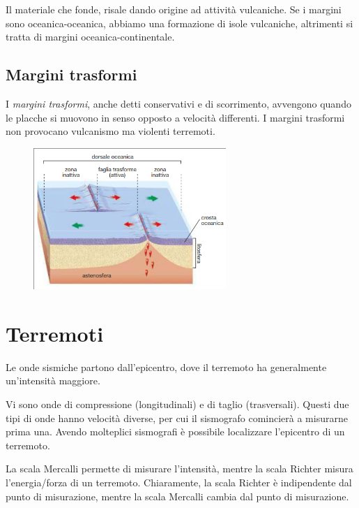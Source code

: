 \documentclass[a4paper]{article}
\begin{document}
Il materiale che fonde, risale dando origine ad attività vulcaniche.
Se i margini sono oceanica-oceanica, abbiamo una formazione di isole vulcaniche,
altrimenti si tratta di margini oceanica-continentale.

\subsection{Margini trasformi}

I \textit{margini trasformi}, anche detti conservativi e di scorrimento, avvengono quando
le placche si muovono in senso opposto a velocità differenti.
I margini trasformi non provocano vulcanismo ma violenti terremoti.

\begin{figure}[h]
    \centering
    \includegraphics[width=0.65\textwidth]{mtrasformi.png}
\end{figure}

\pagebreak

\section{Terremoti}



Le onde sismiche partono dall'epicentro, dove il terremoto ha generalmente un'intensità maggiore.

Vi sono onde di compressione (longitudinali) e di taglio (trasversali).
Questi due tipi di onde hanno velocità diverse, per cui il sismografo comincierà a misurarne
prima una.
Avendo molteplici sismografi è possibile localizzare l'epicentro di un terremoto.

La scala Mercalli permette di misurare l'intensità, mentre la scala Richter misura l'energia/forza di un terremoto.
Chiaramente, la scala Richter è indipendente dal punto di misurazione, mentre la scala Mercalli cambia dal punto di misurazione.

\end{document}
